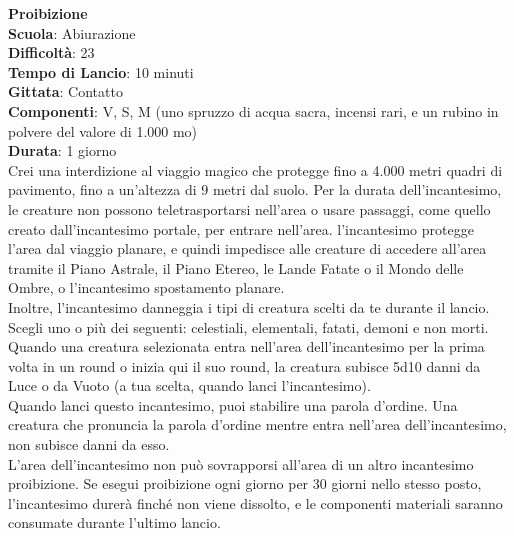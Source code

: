 \begin{multicols}{2}
\medskip\textbf{Proibizione}\\
\textbf{Scuola}: Abiurazione\\
\textbf{Difficoltà}:  23\\
\textbf{Tempo di Lancio}: 10 minuti\\
\textbf{Gittata}: Contatto\\
\textbf{Componenti}: V, S, M (uno spruzzo di acqua sacra, incensi rari, e un rubino in polvere del valore di 1.000 mo)\\
\textbf{Durata}: 1 giorno\\
Crei una interdizione al viaggio magico che protegge fino a 4.000 metri quadri di pavimento, fino a un'altezza di 9 metri dal suolo. Per la durata dell'incantesimo, le creature non possono teletrasportarsi nell'area o usare passaggi, come quello creato dall'incantesimo portale, per entrare nell'area. l'incantesimo protegge l’area dal viaggio planare, e quindi impedisce alle creature di accedere all'area tramite il Piano Astrale, il Piano Etereo, le Lande Fatate o il Mondo delle Ombre, o l'incantesimo spostamento planare.\\
Inoltre, l'incantesimo danneggia i tipi di creatura scelti da te durante il lancio. Scegli uno o più dei seguenti: celestiali, elementali, fatati, demoni e non morti. Quando una creatura selezionata entra nell'area dell'incantesimo per la prima volta in un round o inizia qui il suo round, la creatura subisce 5d10 danni da Luce o da Vuoto (a tua scelta, quando lanci l'incantesimo). \\
Quando lanci questo incantesimo, puoi stabilire una parola d’ordine. Una creatura che pronuncia la parola d’ordine mentre entra nell'area dell'incantesimo, non subisce danni da esso.\\
L’area dell'incantesimo non può sovrapporsi all'area di un altro incantesimo proibizione. Se esegui proibizione ogni giorno per 30 giorni nello stesso posto, l'incantesimo durerà finché non viene dissolto, e le componenti materiali saranno consumate durante l’ultimo lancio.


\end{multicols}
